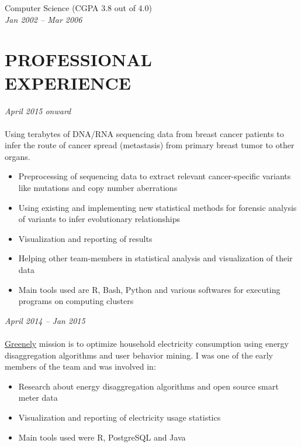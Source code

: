 \documentclass[margin, 10pt]{res} %
\begin{document}
\begin{resume}
{\bf \color{Black}{Bachelor of Science,}} Computer Science (CGPA 3.8 out of 4.0) \\
{\color{RubineRed}{University of Peshawar, Pakistan}} \hfill \textit{Jan 2002 -- Mar 2006} \\

 
\section{PROFESSIONAL \\ EXPERIENCE}

{\sl \textbf{}} \hfill \textit{April 2015 onward} \\
{\color{RubineRed}{Karolinska Institute, Sweden}} \\
Using terabytes of DNA/RNA sequencing data from breast cancer patients to infer the route of cancer spread (metastasis) from primary breast tumor to other organs. 
\begin{itemize} 
\item Preprocessing of sequencing data to extract relevant cancer-specific variants like mutations and copy number aberrations
\item Using existing and implementing new statistical methods for forensic analysis of variants to infer evolutionary relationships
\item Visualization and reporting of results
\item Helping other team-members in statistical analysis and visualization of their data 
\item Main tools used are R, Bash, Python and various softwares for executing programs on computing clusters
\end{itemize} 

{\sl \textbf{}} \hfill \textit{April 2014 -- Jan 2015} \\
{\color{RubineRed}{Greenely, Sweden}} \\
\href{http://www.greenely.com}{Greenely} mission is to optimize household electricity consumption using energy disaggregation algorithms and user behavior mining. I was one of the early members of the team and was involved in:
\begin{itemize} 
\item Research about energy disaggregation algorithms and open source smart meter data
\item Visualization and reporting of electricity usage statistics 
\item Main tools used were R, PostgreSQL and Java
\end{itemize} 


\end{resume}
\end{document}
